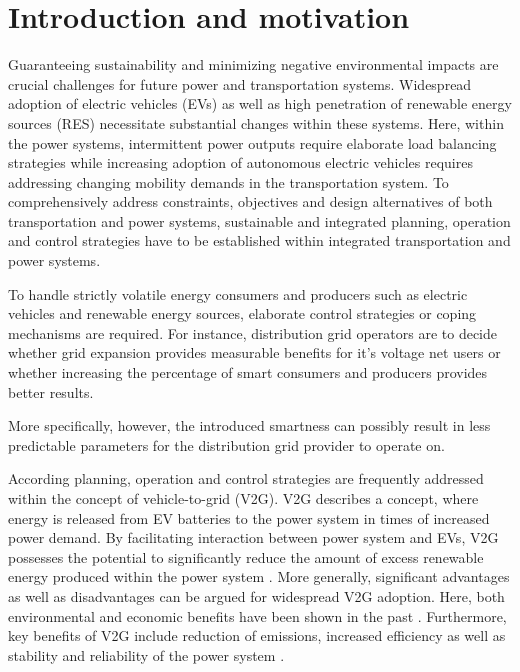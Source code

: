 \section{Introduction and motivation}

Guaranteeing sustainability and minimizing negative environmental impacts are crucial challenges for future power and transportation systems. Widespread adoption of electric vehicles (EVs) as well as high penetration of renewable energy sources (RES) necessitate substantial changes within these systems. Here, within the power systems, intermittent power outputs require elaborate load balancing strategies while increasing adoption of autonomous electric vehicles requires addressing changing mobility demands in the transportation system. To comprehensively address constraints, objectives and design alternatives of both transportation and power systems, sustainable and integrated planning, operation and control strategies have to be established within integrated transportation and power systems.

To handle strictly volatile energy consumers and producers such as electric vehicles and renewable energy sources, elaborate control strategies or coping mechanisms are required. For instance, distribution grid operators are to decide whether grid expansion provides measurable benefits for it's voltage net users or whether increasing the percentage of smart consumers and producers provides better results.

More specifically, however, the introduced smartness can possibly result in less predictable parameters for the distribution grid provider to operate on.

According planning, operation and control strategies are frequently addressed within the concept of vehicle-to-grid (V2G). V2G describes a concept, where energy is released from EV batteries to the power system in times of increased power demand.  By facilitating interaction between power system and EVs, V2G possesses the potential to significantly reduce the amount of excess renewable energy produced within the power system \cite{richardson2013electric}. More generally, significant advantages as well as disadvantages can be argued for widespread V2G adoption. Here, both environmental and economic benefits have been shown in the past \cite{faria2012sustainability, richardson2013electric, mwasilu2014electric}. Furthermore, key benefits of V2G include reduction of emissions, increased efficiency as well as stability and reliability of the power system \cite{yilmaz2013review}.

